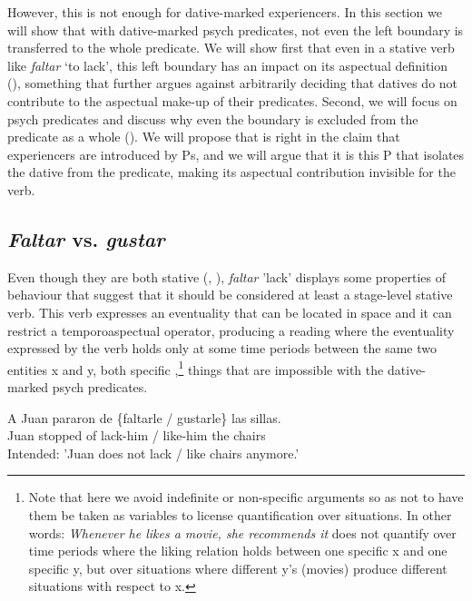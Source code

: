 \documentclass[output=paper,colorlinks,citecolor=brown,nonflat]{./langscibook}
\begin{document}
However, this is not enough for dative-marked experiencers. In this section we will show that with dative-marked psych predicates, not even the left boundary is transferred to the whole predicate. We will show first that even in a stative verb like \textit{faltar} `to lack', this left boundary has an impact on its aspectual definition (), something that further argues against arbitrarily deciding that datives do not contribute to the aspectual make-up of their predicates. Second, we will focus on psych predicates and discuss why even the boundary is excluded from the predicate as a whole (). We will propose that \citet{Landau2010} is right in the claim that experiencers are introduced by Ps, and we will argue that it is this P that isolates the dative from the predicate, making its aspectual contribution invisible for the verb.

\subsection{\textit{Faltar} vs. \textit{gustar}}\label{sec:fabregas:3.1}

Even though they are both stative (, \citealt{GarcíaFernándezGutiérrezBergarecheMartinez2006}), \textit{faltar} {}'lack' displays some properties of behaviour that suggest that it should be considered at least a stage-level stative verb. This verb expresses an eventuality that can be located in space  and it can restrict a temporoaspectual operator, producing a reading where the eventuality expressed by the verb holds only at some time periods between the same two entities x and y, both specific \citet[cf. 27]{Kratzer1995},\footnote{Note that here we avoid indefinite or non-specific arguments so as not to have them be taken as variables to license quantification over situations. In other words: \textit{Whenever he likes a movie, she recommends it} does not quantify over time periods where the liking relation holds between one specific x and one specific y, but over situations where different y's (movies) produce different situations with respect to x.} things that are impossible with the dative-marked psych predicates.

\ea%
    \label{ex:fabregas:25}
    \gll    *A Juan  pararon de \{faltarle / gustarle\} las  sillas.\\
             {Juan} {stopped} {of}   {lack-him} {/} {like-him} {the} {chairs}\\
    \glt    Intended: 'Juan does not lack / like chairs anymore.'
    \z
\end{document}
